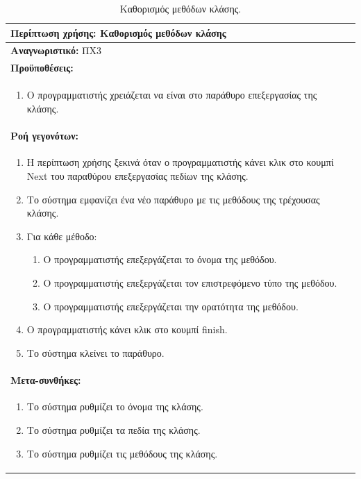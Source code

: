 \begin{table}[H]
	\hspace*{-0.2cm}
    \centering
    \scriptsize
	\begin{tabular}{|p{10cm}|}
	\hline
		\textbf{Περίπτωση χρήσης:} Καθορισμός μεθόδων κλάσης \\
	\hline
		\textbf{Αναγνωριστικό:} ΠΧ3 \\
	\hline	
		\textbf{Προϋποθέσεις:} \\
		\begin{enumerate}
		 \item Ο προγραμματιστής χρειάζεται να είναι στο παράθυρο επεξεργασίας της κλάσης.
		\end{enumerate} \\
	\hline
		\textbf{Ροή γεγονότων:} \\
			\begin{enumerate}
		 \item Η περίπτωση χρήσης ξεκινά όταν ο προγραμματιστής κάνει κλικ στο κουμπί Next του παραθύρου επεξεργασίας πεδίων της κλάσης.
		 \item Το σύστημα εμφανίζει ένα νέο παράθυρο με τις μεθόδους της τρέχουσας κλάσης.
		 \item Για κάθε μέθοδο:\begin{enumerate}
						 		 \item Ο προγραμματιστής επεξεργάζεται το όνομα της μεθόδου.
								 \item Ο προγραμματιστής επεξεργάζεται τον επιστρεφόμενο τύπο της μεθόδου.
		 						  \item Ο προγραμματιστής επεξεργάζεται την ορατότητα της μεθόδου.
			 		 		  \end{enumerate}
 		 \item Ο προγραμματιστής κάνει κλικ στο κουμπί finish.
 		 \item Το σύστημα κλείνει το παράθυρο.
		\end{enumerate} \\
	\hline
		\textbf{Μετα-συνθήκες:} \\
		\begin{enumerate}
			\item Το σύστημα ρυθμίζει το όνομα της κλάσης.
			\item Το σύστημα ρυθμίζει τα πεδία της κλάσης.
			\item Το σύστημα ρυθμίζει τις μεθόδους της κλάσης.
		\end{enumerate} \\
	\hline
    \end{tabular}
    \caption{Καθορισμός μεθόδων κλάσης.}
    \label{tab:setClassMethodsUC}
\end{table}
